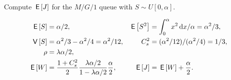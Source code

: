 \documentclass[queueing-book.tex]{subfiles}
\begin{document}
\begin{exercise}
 Compute $\,\mathsf{E}\left[J\right]$ for the $M/G/1$ queue with $S\sim U[0,\alpha]$.
\begin{solution}
 \begin{align*}
\,\mathsf{E}\left[S\right] &= \alpha/2, & \,\mathsf{E}\left[S^2\right] &= \int_0^\alpha x^2 \,\textrm{d}x/\alpha = \alpha^2/3,\\
\,\mathsf{V}\left[S\right] &= \alpha^2/3 - \alpha^2/4= \alpha^2/12, & C_s^2 &= (\alpha^2/12)/(\alpha^2/4) = 1/3,\\
\rho &= \lambda \alpha/2,\\
\,\mathsf{E}\left[W\right] &= \frac{1+C_s^2}2 \frac{\lambda \alpha/2}{1-\lambda \alpha/2}\frac \alpha2, &
\,\mathsf{E}\left[J\right] &= \,\mathsf{E}\left[W\right] + \frac \alpha2.
 \end{align*}
\end{solution}
\end{exercise}




\end{document}
